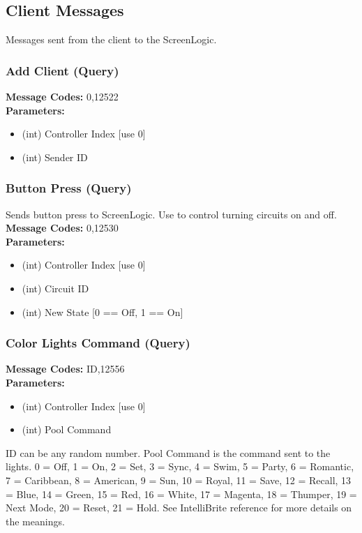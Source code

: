 \documentclass[11pt]{article}
\begin{document}
\clearpage
\subsection{Client Messages}
Messages sent from the client to the ScreenLogic.

\subsubsection{Add Client (Query)}
\label{msg:12522}
{\bf Message Codes: } 0,12522\\
{\bf Parameters: }
\small
\begin{itemize}
\item (int) Controller Index [use 0]
\item (int) Sender ID
\end{itemize}
\normalsize

\subsubsection{Button Press (Query)}
\label{msg:12544}
Sends button press to ScreenLogic. Use to control turning circuits on and off.\\
{\bf Message Codes: } 0,12530\\
{\bf Parameters: }
\small
\begin{itemize}
\item (int) Controller Index [use 0]
\item (int) Circuit ID
\item (int) New State [0 == Off, 1 == On]
\end{itemize}
\normalsize

\subsubsection{Color Lights Command (Query)}
\label{msg:12556}
{\bf Message Codes: } ID,12556\\
{\bf Parameters: }
\small
\begin{itemize}
\item (int) Controller Index [use 0]
\item (int) Pool Command
\end{itemize}
\normalsize
ID can be any random number. Pool Command is the command sent to the lights. 0 = Off, 1 = On, 2 = Set, 3 = Sync, 4 = Swim, 5 = Party, 6 = Romantic, 7 = Caribbean, 8 = American, 9 = Sun, 10 = Royal,
11 = Save, 12 = Recall, 13 = Blue, 14 = Green, 15 = Red, 16 = White, 17 = Magenta, 18 = Thumper, 19 = Next Mode, 20 = Reset, 21 = Hold. See IntelliBrite reference for more details on the meanings.
\end{document}
